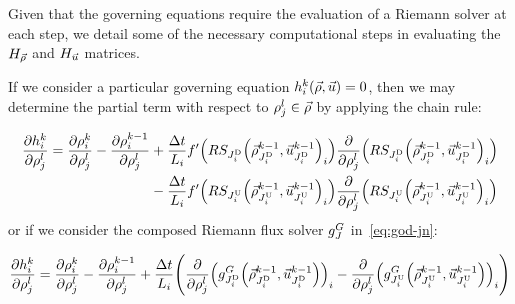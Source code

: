		Given that the governing equations require the evaluation of a Riemann
		solver at each step, we detail some of the necessary computational
		steps in evaluating the $H_{\vec{\rho}}$ and $H_{\vec{u}}$ matrices. 
				
		If we consider a particular governing equation $\syseq_{\link}^{\tind}\left(\state,\control\right)=0$,
		then we may determine the partial term with respect to $\rho_{j}^{l}\in\vec{\rho}$
		by applying the chain rule:
				
		\begin{align}
			\pfrac{\syseq_{\link}^{\tind}}{\discrete jl}=\pfrac{\discrete{\link}{\tind}}{\discrete jl}-\pfrac{\discrete{\link}{\tind-1}}{\discrete jl} & +\frac{\Delta t}{L_{i}}f'\left(\RS_{\jdown{\link}}\left(\juncstate{\jdown{\link}}{\tind-1},\junccon{\jdown{\link}}{\tind-1}\right)_{\link}\right)\pfrac{}{\discrete jl}\left(\RS_{\jdown{\link}}\left(\juncstate{\jdown{\link}}{\tind-1},\junccon{\jdown{\link}}{\tind-1}\right)_{\link}\right)\label{eq:dhdufull} \\
			                                                                                                                                           & -\frac{\Delta t}{L_{i}}f'\left(\RS_{\jup{\link}}\left(\juncstate{\jup{\link}}{\tind-1},\junccon{\jup{\link}}{\tind-1}\right)_{\link}\right)\pfrac{}{\discrete jl}\left(\RS_{\jup{\link}}\left(\juncstate{\jup{\link}}{\tind-1},\junccon{\jup{\link}}{\tind-1}\right)_{\link}\right)\nonumber                       
		\end{align}				
		or if we consider the composed Riemann flux solver $g^{G}_{J}$ in~\eqref{eq:god-jn}:
				
		\begin{equation}
			\pfrac{\syseq_{\link}^{\tind}}{\discrete jl}=\pfrac{\discrete{\link}{\tind}}{\discrete jl}-\pfrac{\discrete{\link}{\tind-1}}{\discrete jl}+\frac{\Delta t}{L_{i}}\left(\pfrac{}{\discrete jl}\left(\god_{\jdown{\link}}\left(\juncstate{\jdown{\link}}{\tind-1},\junccon{\jdown{\link}}{\tind-1}\right)\right)_{\link}-\pfrac{}{\discrete jl}\left(\god_{\jup{\link}}\left(\juncstate{\jup{\link}}{\tind-1},\junccon{\jup{\link}}{\tind-1}\right)\right)_{\link}\right)\label{eq:dhdugod}
		\end{equation}
				
